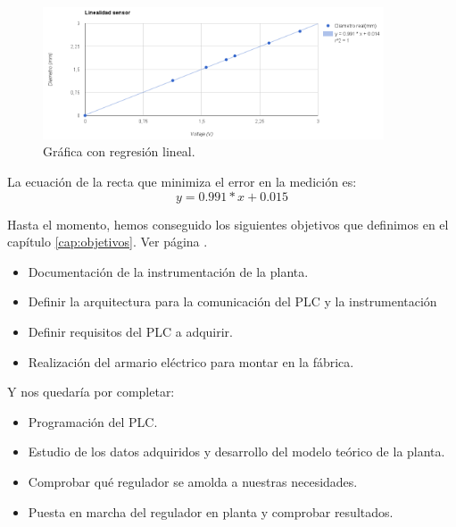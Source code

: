    \begin{figure}[H]
            \centering
            \includegraphics[width=0.9\textwidth]{images/sensor/linealidad_sensor.png}
            \caption{Gráfica con regresión lineal.}
            \label{fig:sens_regre}
    \end{figure}

La ecuación de la recta que minimiza el error en la medición es:
$$y= 0.991*x +0.015$$

Hasta el momento, hemos conseguido los siguientes objetivos que definimos en el capítulo \ref{cap:objetivos}. Ver página \pageref{Listado_objetivos}.

\begin{itemize}
	\item Documentación de la instrumentación de la planta.
	\item Definir la arquitectura para la comunicación del PLC y la instrumentación
	\item Definir requisitos del PLC a adquirir.
	\item Realización del armario eléctrico para montar en la fábrica.
\end{itemize}

Y nos quedaría por completar:

\begin{itemize}
	\item Programación del PLC.
	\item Estudio de los datos adquiridos y desarrollo del modelo teórico de la planta.
	\item Comprobar qué regulador se amolda a nuestras necesidades.
	\item Puesta en marcha del regulador en planta y comprobar resultados.
\end{itemize}